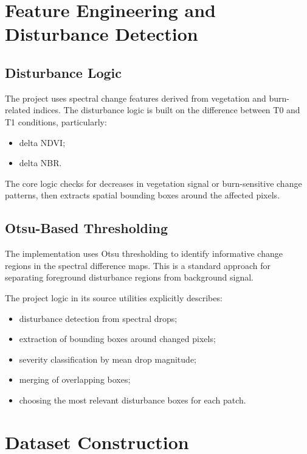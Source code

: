 \documentclass[11pt]{article}
\begin{document}
\section{Feature Engineering and Disturbance Detection}

\subsection{Disturbance Logic}
The project uses spectral change features derived from vegetation and burn-related indices. The disturbance logic is built on the difference between T0 and T1 conditions, particularly:
\begin{itemize}
    \item delta NDVI;
    \item delta NBR.
\end{itemize}

The core logic checks for decreases in vegetation signal or burn-sensitive change patterns, then extracts spatial bounding boxes around the affected pixels.

\subsection{Otsu-Based Thresholding}
The implementation uses Otsu thresholding to identify informative change regions in the spectral difference maps. This is a standard approach for separating foreground disturbance regions from background signal.

The project logic in its source utilities explicitly describes:
\begin{itemize}
    \item disturbance detection from spectral drops;
    \item extraction of bounding boxes around changed pixels;
    \item severity classification by mean drop magnitude;
    \item merging of overlapping boxes;
    \item choosing the most relevant disturbance boxes for each patch.
\end{itemize}

\section{Dataset Construction}
\end{document}
